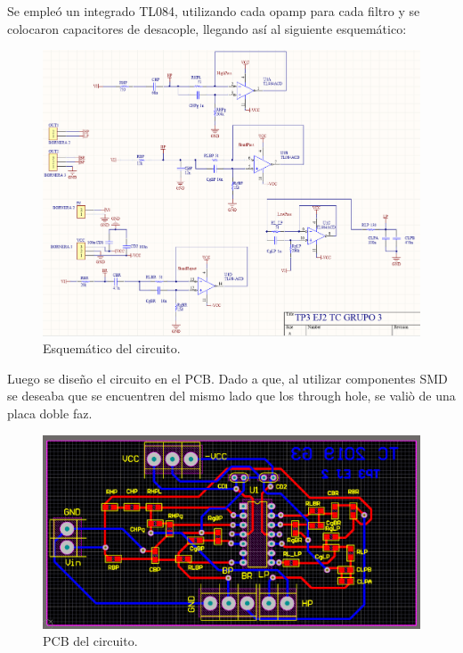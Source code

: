 Se empleó un integrado TL084, utilizando cada opamp para cada filtro y se colocaron capacitores de desacople, llegando así al siguiente esquemático:
\begin{figure}[H]	
	\centering
	\includegraphics[width=\textwidth]{ImagenesEj2/esquematico.PNG}
	\caption{Esquemático del circuito.}
	\label{fig:esq}
\end{figure}

Luego se diseño el circuito en el PCB. Dado a que, al utilizar componentes SMD se deseaba que se encuentren del mismo lado que los through hole, se valiò de una placa doble faz.
\begin{figure}[H]	
	\centering
	\includegraphics[width=\textwidth]{ImagenesEj2/pcb.PNG}
	\caption{PCB del circuito.}
	\label{fig:pcb}
\end{figure}
%
